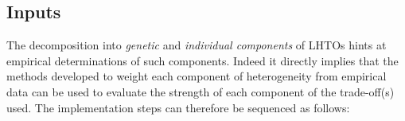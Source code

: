 \documentclass[10pt,a4paper]{article}
\begin{document}
\subsection{Inputs}



The decomposition into \emph{genetic} and \emph{individual components} of LHTOs hints at empirical determinations of such components. Indeed it directly implies that the methods developed to weight each component of heterogeneity from empirical data \citep[see review in][]{Hamel2018a} can be used to evaluate the strength of each component of the trade-off(s) used. The implementation steps can therefore be sequenced as follows:
\end{document}
